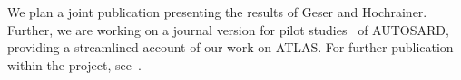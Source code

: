 \documentclass[10pt,a4paper]{article}
\newcommand*{\atlas}{\textsf{ATLAS}}
\begin{document}
We plan a joint publication presenting the results of Geser and Hochrainer. Further, we are working on a journal version for pilot
studies~\cite{LMZ:2021,LMZ:2022} of AUTOSARD, providing a streamlined account of our work on \atlas.
%
For further publication within the project, see~\cite{AvanziniMS23,ParsertP24}.


\small

\end{document}
